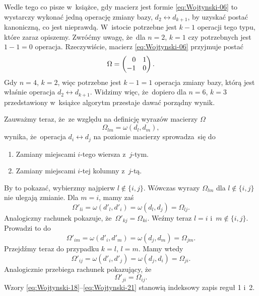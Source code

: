 \documentclass[a4paper,11pt]{article}
\begin{document}
Wedle tego co pisze w~książce, gdy macierz jest formie
\eqref{eq:Wojtynski-06} to wystarczy wykonać jedną operację zmiany bazy,
$d_{ 2 } \leftrightarrow d_{ k + 1 }$, by uzyskać postać kanoniczną, co jest nieprawdą.
W~istocie potrzebne jest $k - 1$ operacji tego typu, które zaraz opiszemy.
Zwróćmy uwagę, że~dla $n = 2$, $k = 1$ czy potrzebnych jest $1 - 1 = 0$
operacja. Rzeczywiście, macierz \eqref{eq:Wojtynski-06} przyjmuje postać
\begin{equation}
  \label{eq:Wojtynski-16}
  \Omega =
  \begin{pmatrix}
    \hphantom{-} 0 & 1 \\
    -1 & 0
  \end{pmatrix}.
\end{equation}
Gdy $n = 4$, $k = 2$, więc potrzebne jest $k - 1 = 1$ operacja zmiany bazy,
którą jest właśnie operacja $d_{ 2 } \leftrightarrow d_{ k + 1 }$. Widzimy więc, że~dopiero
dla $n = 6$, $k = 3$ przedstawiony w~książce algorytm przestaje dawać
porządny wynik.

Zauważmy teraz, że~ze względu na definicję wyrazów macierzy $\Omega$
\begin{equation}
  \label{eq:Wojtynski-17}
  \Omega_{ l m } = \omega( d_{ l }, d_{ m } ),
\end{equation}
wynika, że~operacja $d_{ i } \leftrightarrow d_{ j }$ na poziomie macierzy sprowadza~się do
\begin{enumerate}

\item Zamiany miejscami $i$-tego wiersza z~$j$-tym.

\item Zamiany miejscami $i$-tej kolumny z~$j$-tą.

\end{enumerate}
By to pokazać, wybierzmy najpierw $l \notin \{ i, j \}$. Wówczas wyrazy
$\Omega_{ l m }$ dla $l \notin \{ i, j \}$ nie ulegają zmianie. Dla $m = i$, mamy zaś
\begin{equation}
  \label{eq:Wojtynski-18}
  \Omega'_{ l i } = \omega( d'_{ l }, d'_{ i } ) = \omega( d_{ l }, d_{ j } ) =
  \Omega_{ l j }.
\end{equation}
Analogiczny rachunek pokazuje, że~$\Omega'_{ k j } = \Omega_{ k i }$. Weźmy teraz
$l = i$ i~$m \notin \{ i, j \}$. Prowadzi to do
\begin{equation}
  \label{eq:Wojtynski-19}
  \Omega'_{ i m } = \omega( d'_{ i }, d'_{ m } ) = \omega( d_{ j }, d_{ m } ) =
  \Omega_{ j m }.
\end{equation}
Przejdźmy teraz do przypadku $k = l$, $l = m$. Mamy wtedy
\begin{equation}
  \label{eq:Wojtynski-20}
  \Omega'_{ i j } = \omega( d'_{ i }, d'_{ j } ) = \omega( d_{ j }, d_{ i } ) =
  \Omega_{ j i }.
\end{equation}
Analogicznie przebiega rachunek pokazujący, że
\begin{equation}
  \label{eq:Wojtynski-21}
  \Omega'_{ j i } = \Omega_{ i j }.
\end{equation}
Wzory \eqref{eq:Wojtynski-18}--\eqref{eq:Wojtynski-21} stanowią indeksowy
zapis reguł 1 i~2.
\end{document}
